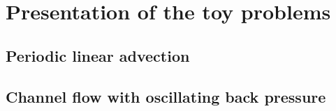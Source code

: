 \chapter{Presentation of the toy problems}
\label{cha:toy_problems}

\chabstract{}

\minitoc
\newpage


\section{Periodic linear advection}
\label{sec:toy_convection}


\section{Channel flow with oscillating back pressure}
\label{sec:toy_channel}


\chconclu{}
